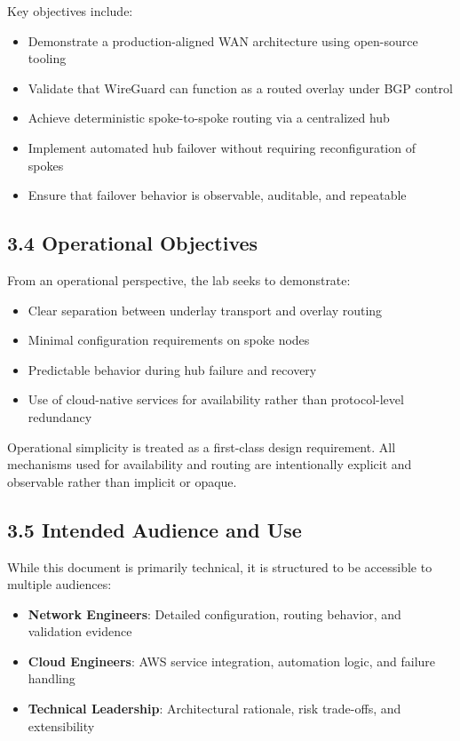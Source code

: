 \documentclass[11pt]{article}
\begin{document}
Key objectives include:

\begin{itemize}
  \item Demonstrate a production-aligned WAN architecture using open-source tooling
  \item Validate that WireGuard can function as a routed overlay under BGP control
  \item Achieve deterministic spoke-to-spoke routing via a centralized hub
  \item Implement automated hub failover without requiring reconfiguration of spokes
  \item Ensure that failover behavior is observable, auditable, and repeatable
\end{itemize}

\subsection{3.4 Operational Objectives}
\label{sec:operational-objectives}

From an operational perspective, the lab seeks to demonstrate:

\begin{itemize}
  \item Clear separation between underlay transport and overlay routing
  \item Minimal configuration requirements on spoke nodes
  \item Predictable behavior during hub failure and recovery
  \item Use of cloud-native services for availability rather than protocol-level redundancy
\end{itemize}

Operational simplicity is treated as a first-class design requirement. All mechanisms used for availability and routing are intentionally explicit and observable rather than implicit or opaque.

\subsection{3.5 Intended Audience and Use}
\label{sec:intended-use}

While this document is primarily technical, it is structured to be accessible to multiple audiences:

\begin{itemize}
  \item \textbf{Network Engineers}: Detailed configuration, routing behavior, and validation evidence
  \item \textbf{Cloud Engineers}: AWS service integration, automation logic, and failure handling
  \item \textbf{Technical Leadership}: Architectural rationale, risk trade-offs, and extensibility
\end{itemize}
\end{document}
